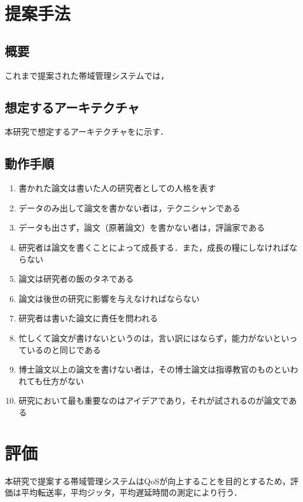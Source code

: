 \documentclass[a4paper,10pt,twocolumn,uplatex]{jsarticle}
\begin{document}
\section{提案手法}

\subsection{概要}
これまで提案された帯域管理システムでは，

\subsection{想定するアーキテクチャ}
本研究で想定するアーキテクチャをに示す．

\subsection{動作手順}

\begin{enumerate} %
  \item 書かれた論文は書いた人の研究者としての人格を表す
  \item データのみ出して論文を書かない者は，テクニシャンである
  \item データも出さず，論文（原著論文）を書かない者は，評論家である
  \item 研究者は論文を書くことによって成長する．また，成長の糧にしなければならない
  \item 論文は研究者の飯のタネである
  \item 論文は後世の研究に影響を与えなければならない
  \item 研究者は書いた論文に責任を問われる
  \item 忙しくて論文が書けないというのは，言い訳にはならず，能力がないといっているのと同じである
  \item 博士論文以上の論文を書けない者は，その博士論文は指導教官のものといわれても仕方がない
  \item 研究において最も重要なのはアイデアであり，それが試されるのが論文である
\end{enumerate}

\section{評価}
本研究で提案する帯域管理システムはQoSが向上することを目的とするため，評価は平均転送率，平均ジッタ，平均遅延時間の測定により行う．
\end{document}
